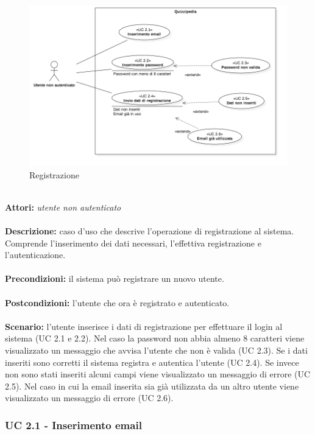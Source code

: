 \documentclass[a4paper,11pt]{article}
\begin{document}
\begin{figure}[h!]
\centering
\includegraphics[scale=0.6]{../immagini/UC2.png}
\caption{Registrazione}
\end{figure}
\ \\
\textbf{Attori:} \textit{utente non autenticato}
\\ \\
\textbf{Descrizione:} caso d'uso che descrive l'operazione di registrazione al sistema. Comprende l'inserimento dei dati necessari, l'effettiva registrazione e l'autenticazione.\\
\\
\textbf{Precondizioni:} il sistema può registrare un nuovo utente.\\
\\
\textbf{Postcondizioni:} l’utente che ora è registrato e autenticato.\\
\\
\textbf{Scenario:} l’utente inserisce i dati di registrazione per effettuare il login al sistema (UC 2.1 e 2.2). Nel caso la password non abbia almeno 8 caratteri viene visualizzato un messaggio che avvisa l'utente che non è valida (UC 2.3). Se i dati inseriti sono corretti il sistema registra e autentica l'utente (UC 2.4). Se invece non sono stati inseriti alcuni campi viene visualizzato un messaggio di errore (UC 2.5). Nel caso in cui la email inserita sia già utilizzata da un altro utente viene visualizzato un messaggio di errore (UC 2.6).\\


\subsubsection{UC 2.1 - Inserimento email}
\end{document}
